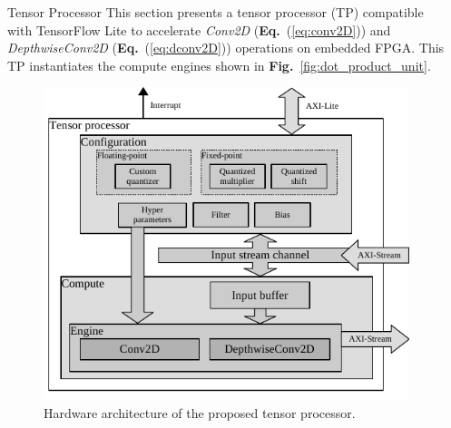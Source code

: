 \documentclass[final]{beamer}
\newlength{\onecolwid}
\newlength{\twocolwid}
\newcommand\fig[1]{\textbf{Fig.}~\ref{#1}}
\newcommand\equ[1]{\textbf{Eq.}~(\ref{#1})}
\begin{document}
\begin{frame}[t]
\begin{columns}[t]
\begin{column}{\twocolwid}
\begin{columns}[t,totalwidth=\twocolwid]
\begin{column}{\onecolwid}
\begin{block}{Tensor Processor}
		This section presents a tensor processor (TP) compatible with TensorFlow Lite to accelerate \emph{Conv2D} (\equ{eq:conv2D}) and \emph{DepthwiseConv2D} (\equ{eq:dconv2D}) operations on embedded FPGA. This TP instantiates the compute engines shown in \fig{fig:dot_product_unit}.
	\begin{figure}
		\includegraphics[width=\linewidth]{../figures/accelerator.pdf}
		\caption{Hardware architecture of the proposed tensor processor.}
		\label{fig:accelerator}
	\end{figure}
	
\end{block}

\end{column} %

\begin{column}{\onecolwid}\vspace{-.6in} %



\end{column}
\end{columns}
\end{column}
\end{columns}
\end{frame}
\end{document}
